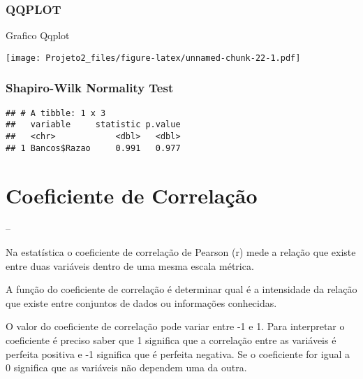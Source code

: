 \documentclass[
]{article}
\newenvironment{Shaded}{\begin{snugshade}}{\end{snugshade}}
\newcommand{\FunctionTok}[1]{\textcolor[rgb]{0.00,0.00,0.00}{#1}}
\newcommand{\NormalTok}[1]{#1}
\newcommand{\SpecialCharTok}[1]{\textcolor[rgb]{0.00,0.00,0.00}{#1}}
\begin{document}
\hypertarget{qqplot}{%
\subsubsection{QQPLOT}\label{qqplot}}

Grafico Qqplot

\begin{Shaded}
\end{Shaded}

\texttt{[image: Projeto2\_files/figure-latex/unnamed-chunk-22-1.pdf]}

\hypertarget{shapiro-wilk-normality-test}{%
\subsubsection{Shapiro-Wilk Normality
Test}\label{shapiro-wilk-normality-test}}

\begin{Shaded}
\end{Shaded}

\begin{verbatim}
## # A tibble: 1 x 3
##   variable     statistic p.value
##   <chr>            <dbl>   <dbl>
## 1 Bancos$Razao     0.991   0.977
\end{verbatim}

\hypertarget{coeficiente-de-correlauxe7uxe3o}{%
\section{Coeficiente de
Correlação}\label{coeficiente-de-correlauxe7uxe3o}}

--

Na estatística o coeficiente de correlação de Pearson (r) mede a relação
que existe entre duas variáveis dentro de uma mesma escala métrica.

A função do coeficiente de correlação é determinar qual é a intensidade
da relação que existe entre conjuntos de dados ou informações
conhecidas.

O valor do coeficiente de correlação pode variar entre -1 e 1. Para
interpretar o coeficiente é preciso saber que 1 significa que a
correlação entre as variáveis é perfeita positiva e -1 significa que é
perfeita negativa. Se o coeficiente for igual a 0 significa que as
variáveis não dependem uma da outra.
\end{document}
